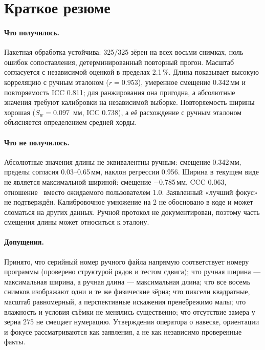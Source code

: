 \documentclass[12pt,a4paper]{article}
\begin{document}
\section{Краткое резюме}

\paragraph{Что получилось.}
Пакетная обработка устойчива: 325/325 зёрен на всех восьми снимках, ноль
ошибок сопоставления, детерминированный повторный прогон. Масштаб
согласуется с независимой оценкой в пределах \num{2.1}\,\%. Длина
показывает высокую корреляцию с ручным эталоном ($r = \num{0.953}$),
умеренное смещение \num{0.342}\,мм и повторяемость ICC \num{0.811};
для ранжирования она пригодна, а абсолютные значения требуют
калибровки на независимой выборке.
Повторяемость ширины хорошая ($S_w = \num{0.097}$~мм, ICC \num{0.738}),
а её расхождение с ручным эталоном объясняется определением средней
хорды.

\paragraph{Что не получилось.}
Абсолютные значения длины не эквивалентны ручным: смещение
\num{0.342}\,мм, пределы согласия \num{0.03}--\num{0.65}\,мм, наклон
регрессии \num{0.956}. Ширина в текущем виде не является максимальной
шириной: смещение \num{-0.785}\,мм, CCC \num{0.063}, отношение
\WidRatio\ вместо ожидаемого пользователем \num{1.0}. Заявленный
«лучший фокус» не подтверждён. Калибровочное умножение на 2 не
обосновано в коде и может сломаться на других данных. Ручной протокол
не документирован, поэтому часть смещения длины может относиться к
эталону.

\paragraph{Допущения.}
Принято, что серийный номер ручного файла напрямую соответствует номеру
программы (проверено структурой рядов и тестом сдвига); что ручная
ширина — максимальная ширина, а ручная длина — максимальная длина; что
все восемь снимков изображают одни и те же физические зёрна; что
пиксели квадратные, масштаб равномерный, а перспективные искажения
пренебрежимо малы; что влажность и условия съёмки не менялись
существенно; что отсутствие замера у зерна 275 не смещает нумерацию.
Утверждения оператора о навеске, ориентации и фокусе рассматриваются
как заявления, а не как независимо проверенные факты.
\end{document}
